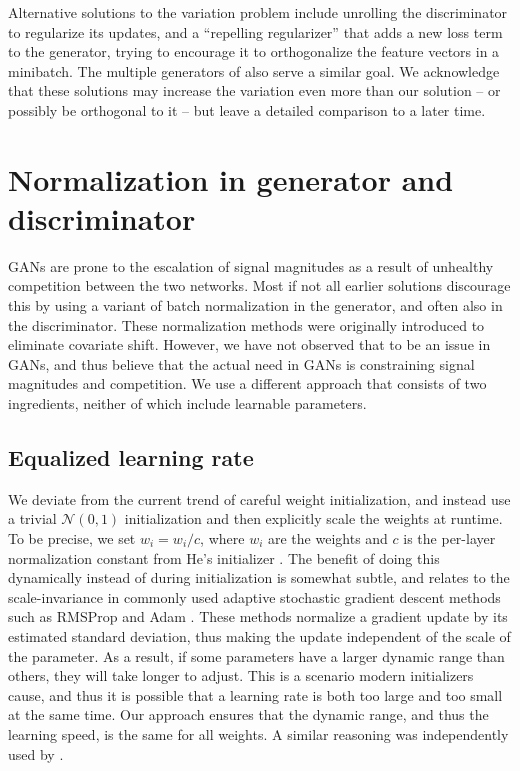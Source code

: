 Alternative solutions to the variation problem include unrolling the discriminator \citep{Metz2016} to regularize its updates, and a ``repelling regularizer'' \citep{Zhao2016} that adds a new loss term to the generator, trying to encourage it to orthogonalize the feature vectors in a minibatch. The multiple generators of \cite{Ghosh2017} also serve a similar goal. We acknowledge that these solutions may increase the variation even more than our solution -- or possibly be orthogonal to it -- but leave a detailed comparison to a later time. 

\section{Normalization in generator and discriminator}
\label{sec:normalization}

GANs are prone to the escalation of signal magnitudes as a result of unhealthy competition between the two networks. Most if not all earlier solutions discourage this by using a variant of batch normalization \citep{Ioffe2015,Salimans2016A,Ba2016} in the generator, and often also in the discriminator. These normalization methods were originally introduced to eliminate covariate shift. However, we have not observed that to be an issue in GANs, and thus believe that the actual need in GANs is constraining signal magnitudes and competition. We use a different approach that consists of two ingredients, neither of which  include learnable parameters.

\subsection{Equalized learning rate}
\label{sec:effective_learning_rate}

We deviate from the current trend of careful weight initialization, and instead use a trivial $\mathcal{N}(0,1)$ initialization and then explicitly scale the weights at runtime. To be precise, we set $\hat{w}_i = w_i / c$, where $w_i$ are the weights and $c$ is the per-layer normalization constant from He's initializer \citep{He2015}. The benefit of doing this dynamically instead of during initialization is somewhat subtle, and relates to the scale-invariance in commonly used adaptive stochastic gradient descent methods such as RMSProp \citep{rmsprop} and Adam \citep{adam}. These methods normalize a gradient update by its estimated standard deviation, thus making the update independent of the scale of the parameter. As a result, if some parameters have a larger dynamic range than others, they will take longer to adjust. This is a scenario modern initializers cause, and thus it is possible that a learning rate is both too large and too small at the same time. Our approach ensures that the dynamic range, and thus the learning speed, is the same for all weights. A similar reasoning was independently used by \cite{Laarhoven2017}.

